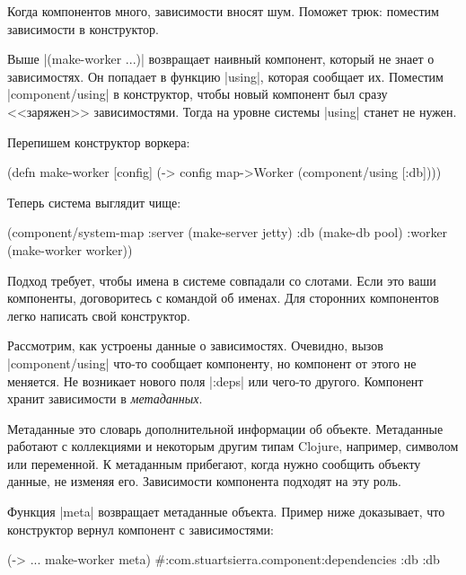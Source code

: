 Когда компонентов много, зависимости вносят шум. Поможет трюк: поместим
зависимости в конструктор.

Выше \spverb|(make-worker {...})| возвращает наивный компонент, который не знает
о зависимостях. Он попадает в функцию \spverb|using|, которая сообщает
их. Поместим \spverb|component/using| в конструктор, чтобы новый компонент был
сразу <<заряжен>> зависимостями. Тогда на уровне системы \spverb|using| станет
не нужен.

Перепишем конструктор воркера:

\begin{english}
  \begin{clojure}
(defn make-worker [config]
  (-> config
      map->Worker
      (component/using [:db])))
  \end{clojure}
\end{english}

Теперь система выглядит чище:

\begin{english}
  \begin{clojure}
(component/system-map
 :server (make-server jetty)
 :db     (make-db pool)
 :worker (make-worker worker))
  \end{clojure}
\end{english}

Подход требует, чтобы имена в системе совпадали со слотами. Если это ваши
компоненты, договоритесь с командой об именах. Для сторонних компонентов легко
написать свой конструктор.

Рассмотрим, как устроены данные о зависимостях. Очевидно, вызов
\spverb|component/using| что-то сообщает компоненту, но компонент от этого не
меняется. Не возникает нового поля \spverb|:deps| или чего-то другого. Компонент
хранит зависимости в \emph{метаданных}.

Метаданные это словарь дополнительной информации об объекте. Метаданные работают
с коллекциями и некоторым другим типам Clojure, например, символом или
переменной. К метаданным прибегают, когда нужно сообщить объекту данные, не
изменяя его. Зависимости компонента подходят на эту роль.

Функция \spverb|meta| возвращает метаданные объекта. Пример ниже доказывает, что
конструктор вернул компонент с зависимостями:

\begin{english}
  \begin{clojure}
(-> {...} make-worker meta)
#:com.stuartsierra.component{:dependencies {:db :db}}
  \end{clojure}
\end{english}

